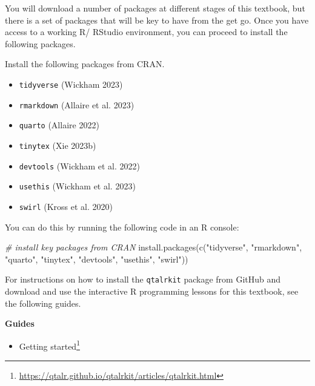 \documentclass[
  letterpaper,
]{latex/krantz}
\newenvironment{Shaded}{\begin{snugshade}}{\end{snugshade}}
\newcommand{\CommentTok}[1]{\textcolor[rgb]{0.00,0.00,0.00}{\textit{#1}}}
\newcommand{\FunctionTok}[1]{\textcolor[rgb]{0.00,0.00,0.00}{#1}}
\newcommand{\NormalTok}[1]{\textcolor[rgb]{0.00,0.00,0.00}{#1}}
\newcommand{\StringTok}[1]{\textcolor[rgb]{0.00,0.00,0.00}{#1}}
\providecommand{\tightlist}{%
  \setlength{\itemsep}{0pt}\setlength{\parskip}{0pt}}\usepackage{longtable,booktabs,array}
\DeclareRobustCommand{\href}[2]{#2\footnote{\url{#1}}}
\begin{document}
You will download a number of packages at different stages of this
textbook, but there is a set of packages that will be key to have from
the get go. Once you have access to a working R/ RStudio environment,
you can proceed to install the following packages.

Install the following packages from CRAN.

\begin{itemize}
\tightlist
\item
  \texttt{tidyverse} (Wickham 2023)
\item
  \texttt{rmarkdown} (Allaire et al. 2023)
\item
  \texttt{quarto} (Allaire 2022)
\item
  \texttt{tinytex} (Xie 2023b)
\item
  \texttt{devtools} (Wickham et al. 2022)
\item
  \texttt{usethis} (Wickham et al. 2023)
\item
  \texttt{swirl} (Kross et al. 2020)
\end{itemize}

You can do this by running the following code in an R console:

\begin{Shaded}
\begin{Highlighting}[]
 \CommentTok{\# install key packages from CRAN}
\FunctionTok{install.packages}\NormalTok{(}\FunctionTok{c}\NormalTok{(}\StringTok{"tidyverse"}\NormalTok{, }\StringTok{"rmarkdown"}\NormalTok{, }\StringTok{"quarto"}\NormalTok{, }\StringTok{"tinytex"}\NormalTok{, }\StringTok{"devtools"}\NormalTok{, }\StringTok{"usethis"}\NormalTok{, }\StringTok{"swirl"}\NormalTok{))}
\end{Highlighting}
\end{Shaded}

For instructions on how to install the \texttt{qtalrkit} package from
GitHub and download and use the interactive R programming lessons for
this textbook, see the following guides.

\begin{tcolorbox}[enhanced jigsaw, left=2mm, arc=.35mm, colback=white, rightrule=.15mm, toprule=.15mm, breakable, leftrule=.75mm, opacityback=0, bottomrule=.15mm]

\textbf{ Guides}

\begin{itemize}
\tightlist
\item
  \href{https://qtalr.github.io/qtalrkit/articles/qtalrkit.html}{Getting
  started}
\end{itemize}

\end{tcolorbox}
\end{document}
